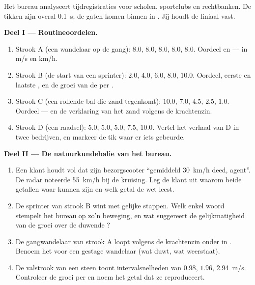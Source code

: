 \begin{problem}\label{pb:g9:uniform-varied-motion:1}
Het bureau analyseert tijdregistraties voor scholen, sportclubs en
rechtbanken. De tikken zijn overal \qty{0.1}{s}; de gaten komen binnen
in . Jij houdt de liniaal vast.

\medskip\noindent\textbf{Deel I --- Routineoordelen.}
\begin{enumerate}
  \item Strook A (een wandelaar op de gang): $8.0$, $8.0$, $8.0$,
        $8.0$, $8.0$. Oordeel en  --- in \unit{m/s} en
        \unit{km/h}.
  \item Strook B (de start van een sprinter): $2.0$, $4.0$, $6.0$,
        $8.0$, $10.0$. Oordeel, eerste en laatste
        , en de groei van de  per
        .
  \item Strook C (een rollende bal die zand tegenkomt): $10.0$, $7.0$,
        $4.5$, $2.5$, $1.0$. Oordeel --- en de verklaring van het zand
        volgens de krachtenzin.
  \item Strook D (een raadsel): $5.0$, $5.0$, $5.0$, $7.5$, $10.0$.
        Vertel het verhaal van D in twee bedrijven, en markeer de tik
        waar er iets gebeurde.
\end{enumerate}

\medskip\noindent\textbf{Deel II --- De natuurkundebalie van het
bureau.}
\begin{enumerate}[resume]
  \item Een klant houdt vol dat zijn bezorgscooter ``gemiddeld
        \qty{30}{km/h} deed, agent''. De radar noteerde \qty{55}{km/h}
        bij de kruising. Leg de klant uit waarom beide getallen waar
        kunnen zijn en welk getal de wet leest.
  \item De sprinter van strook B wint  met gelijke
        stappen. Welk enkel woord stempelt het bureau op zo'n
        beweging, en wat suggereert de gelijkmatigheid van de groei
        over de duwende ?
  \item De gangwandelaar van strook A loopt volgens de krachtenzin
        onder  in . Benoem het  voor
        een gestage wandelaar (wat duwt, wat weerstaat).
  \item De valstrook van een steen toont intervalsnelheden van $0.98$,
        $1.96$, \qty{2.94}{m/s}. Controleer de groei per  en
        noem het getal dat ze reproduceert.
\end{enumerate}


\end{problem}
